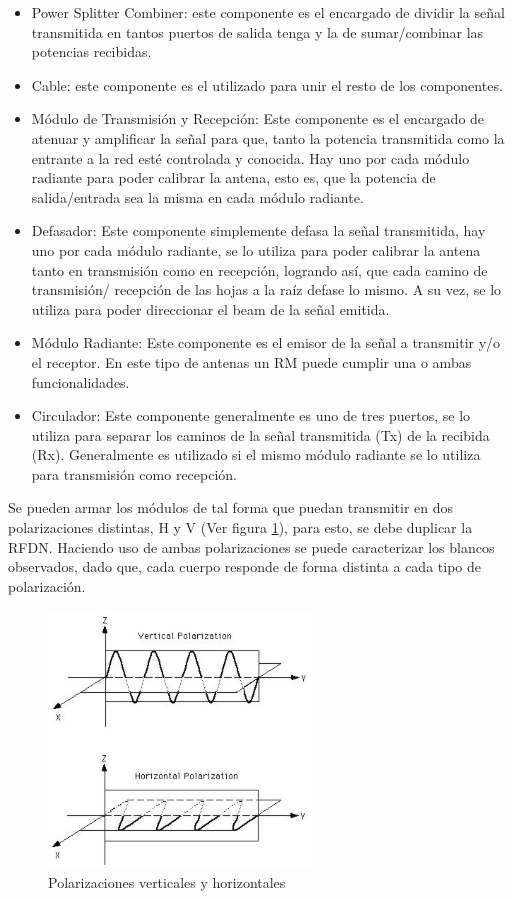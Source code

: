 \begin{itemize}
	\item Power Splitter Combiner: este componente es el encargado de dividir la señal transmitida en tantos puertos de salida 
		tenga y la de sumar/combinar las potencias recibidas.
	\item Cable: este componente es el utilizado para unir el resto de los componentes.
	\item Módulo de Transmisión y Recepción: Este componente es el encargado de atenuar y amplificar la señal para que, tanto
		la potencia transmitida como la entrante a la red esté controlada y conocida. Hay uno por cada módulo radiante para 
		poder calibrar la antena, esto es, que la potencia de salida/entrada sea la misma en cada módulo radiante.
	\item Defasador: Este componente simplemente defasa la señal transmitida, hay uno por cada módulo radiante, se lo utiliza
		para poder calibrar la antena tanto en transmisión como en recepción, logrando así, que cada camino de transmisión/
		recepción de las hojas a la raíz defase lo mismo. A su vez, se lo utiliza para poder direccionar el beam de la señal
		emitida.
	\item Módulo Radiante: Este componente es el emisor de la señal a transmitir y/o el receptor. En este tipo de antenas un 
		RM puede cumplir una o ambas funcionalidades.
	\item Circulador: Este componente generalmente es uno de tres puertos, se lo utiliza para separar los caminos de la 
		señal transmitida (Tx) de la recibida (Rx). Generalmente es utilizado si el mismo módulo radiante se lo utiliza para
		transmisión como recepción.
\end{itemize}

Se pueden armar los módulos de tal forma que puedan transmitir en dos polarizaciones distintas, H y V (Ver figura 
\ref{fig:polarizations}), para esto, se debe duplicar la RFDN. Haciendo uso de ambas polarizaciones se puede caracterizar 
los blancos observados, dado que, cada cuerpo responde de forma distinta a cada tipo de polarización.

\begin{figure}[H]
 \centering
 \includegraphics[width=7cm]{gfx/HAndVPolarizations.png}
 \caption{Polarizaciones verticales y horizontales}
 \label{fig:polarizations}
\end{figure}



